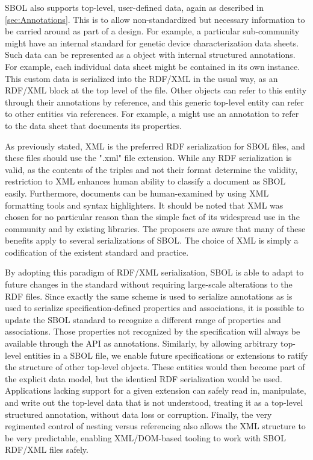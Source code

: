 SBOL also supports top-level, user-defined data, again as described in \ref{sec:Annotations}. This is to allow non-standardized but necessary information to be carried around as part of a design. For example, a particular sub-community might have an internal standard for genetic device characterization data sheets. 
Such data can be represented as a  object with internal structured annotations. 
For example, each individual data sheet might be contained in its own  instance.
This custom data is serialized into the RDF/XML in the usual way, as an RDF/XML block at the top level of the file. 
Other objects can refer to this entity through their annotations by reference, and this generic top-level entity can refer to other entities via references.
For example, a  might use an annotation to refer to the data sheet  that documents its properties.

As previously stated, XML is the preferred RDF serialization for SBOL files, and these files should use the ".xml" file extension. While any RDF serialization is valid, as the contents of the triples and not their format determine the validity, restriction to XML enhances human ability to classify a document as SBOL easily. Furthermore, documents can be human-examined by using XML formatting tools and syntax highlighters. It should be noted that XML was chosen for no particular reason than the simple fact of its widespread use in the community and by existing libraries. The proposers are aware that many of these benefits apply to several serializations of SBOL. The choice of XML is simply a codification of the existent standard and practice.

By adopting this paradigm of RDF/XML serialization, SBOL is able to adapt to future changes in the standard without requiring large-scale alterations to the RDF files. Since exactly the same scheme is used to serialize annotations as is used to serialize specification-defined properties and associations, it is possible to update the SBOL standard to recognize a different range of properties and associations. Those properties not recognized by the specification will always be available through the API as annotations. Similarly, by allowing arbitrary top-level entities in a SBOL file, we enable future specifications or extensions to ratify the structure of other top-level objects. These entities would then become part of the explicit data model, but the identical RDF serialization would be used. Applications lacking support for a given extension can safely read in, manipulate, and write out the top-level data that is not understood, treating it as a top-level structured annotation, without data loss or corruption. Finally, the very regimented control of nesting versus referencing also allows the XML structure to be very predictable, enabling XML/DOM-based tooling to work with SBOL RDF/XML files safely.
